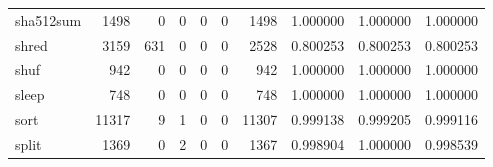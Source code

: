 \begin{longtable}{lrrrrrrrrr}
sha512sum &                                               1498 &                                                  0 &                                                  0 &                                                  0 &                                                  0 &                                               1498 &                                           1.000000 &                               1.000000 &                             1.000000 \\
shred     &                                               3159 &                                                631 &                                                  0 &                                                  0 &                                                  0 &                                               2528 &                                           0.800253 &                               0.800253 &                             0.800253 \\
shuf      &                                                942 &                                                  0 &                                                  0 &                                                  0 &                                                  0 &                                                942 &                                           1.000000 &                               1.000000 &                             1.000000 \\
sleep     &                                                748 &                                                  0 &                                                  0 &                                                  0 &                                                  0 &                                                748 &                                           1.000000 &                               1.000000 &                             1.000000 \\
sort      &                                              11317 &                                                  9 &                                                  1 &                                                  0 &                                                  0 &                                              11307 &                                           0.999138 &                               0.999205 &                             0.999116 \\
split     &                                               1369 &                                                  0 &                                                  2 &                                                  0 &                                                  0 &                                               1367 &                                           0.998904 &                               1.000000 &                             0.998539 \\

\end{longtable}
